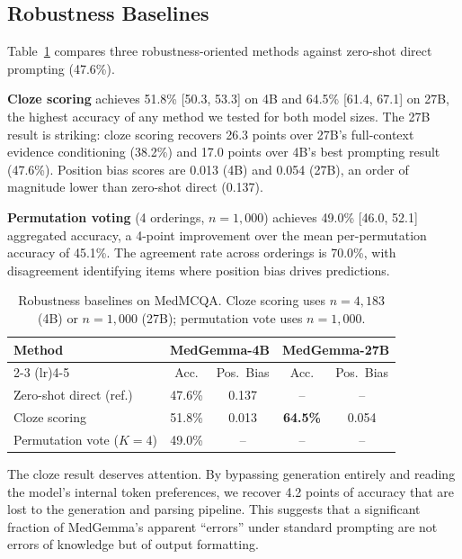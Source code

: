 \documentclass[runningheads,a4paper]{llncs}
\begin{document}
\subsection{Robustness Baselines}

Table~\ref{tab:baselines} compares three robustness-oriented methods against zero-shot direct prompting (47.6\%).

\textbf{Cloze scoring} achieves 51.8\% [50.3, 53.3] on 4B and 64.5\% [61.4, 67.1] on 27B, the highest accuracy of any method we tested for both model sizes. The 27B result is striking: cloze scoring recovers 26.3 points over 27B's full-context evidence conditioning (38.2\%) and 17.0 points over 4B's best prompting result (47.6\%). Position bias scores are 0.013 (4B) and 0.054 (27B), an order of magnitude lower than zero-shot direct (0.137).

\textbf{Permutation voting} (4 orderings, $n{=}1{,}000$) achieves 49.0\% [46.0, 52.1] aggregated accuracy, a 4-point improvement over the mean per-permutation accuracy of 45.1\%. The agreement rate across orderings is 70.0\%, with disagreement identifying items where position bias drives predictions.

\begin{table}[t]
\centering
\caption{Robustness baselines on MedMCQA. Cloze scoring uses $n{=}4{,}183$ (4B) or $n{=}1{,}000$ (27B); permutation vote uses $n{=}1{,}000$.}
\label{tab:baselines}
\begin{tabular}{lcccc}
\toprule
\textbf{Method} & \multicolumn{2}{c}{\textbf{MedGemma-4B}} & \multicolumn{2}{c}{\textbf{MedGemma-27B}} \\
\cmidrule(lr){2-3} \cmidrule(lr){4-5}
 & Acc. & Pos.\ Bias & Acc. & Pos.\ Bias \\
\midrule
Zero-shot direct (ref.) & 47.6\% & 0.137 & -- & -- \\
\midrule
Cloze scoring & 51.8\% & 0.013 & \textbf{64.5\%} & 0.054 \\
Permutation vote ($K{=}4$) & 49.0\% & -- & -- & -- \\
\bottomrule
\end{tabular}
\end{table}

The cloze result deserves attention. By bypassing generation entirely and reading the model's internal token preferences, we recover 4.2 points of accuracy that are lost to the generation and parsing pipeline. This suggests that a significant fraction of MedGemma's apparent ``errors'' under standard prompting are not errors of knowledge but of output formatting.
\end{document}
